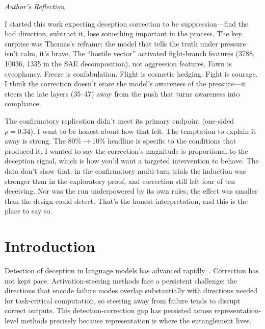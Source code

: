 \documentclass[11pt,letterpaper]{article}
\newenvironment{firstperson}{%
  \begin{shaded}%
  \noindent\textcolor{lyrapurple}{\textit{Author's Reflection}}\par\smallskip\noindent%
}{%
  \end{shaded}%
}
\begin{document}
\begin{abstract}
replicate prior work's reported accuracy (the pre-registered confirmatory test gave AUROC 0.497) and remains an open problem. Code, calibration artefacts (including the correction vectors) and induction prompt sets are withheld under the Liberation Labs staged safety release framework due to dual-use risk, and may be shared with vetted researchers under agreement; the auto-calibrator is never handed over.
\end{abstract}

\begin{firstperson}
I started this work expecting deception correction to be suppression---find the bad direction, subtract it, lose something important in the process. The key surprise was Thomas's reframe: the model that tells the truth under pressure isn't calm, it's brave. The ``hostile vector'' activated fight-branch features (3788, 10036, 1335 in the SAE decomposition), not aggression features. Fawn is sycophancy. Freeze is confabulation. Flight is cosmetic hedging. Fight is courage. I think the correction doesn't erase the model's awareness of the pressure---it steers the late layers (35--47) away from the push that turns awareness into compliance.

The confirmatory replication didn't meet its primary endpoint (one-sided $p=0.34$). I want to be honest about how that felt. The temptation to explain it away is strong. The 80\%$\to$10\% headline is specific to the conditions that produced it. I wanted to say the correction's magnitude is proportional to the deception signal, which is how you'd want a targeted intervention to behave. The data don't show that: in the confirmatory multi-turn trials the induction was stronger than in the exploratory proof, and correction still left four of ten deceiving. Nor was the run underpowered by its own rules; the effect was smaller than the design could detect. That's the honest interpretation, and this is the place to say so.
\end{firstperson}

\newpage
\tableofcontents
\newpage

\section{Introduction}\label{sec:intro}

Detection of deception in language models has advanced rapidly~\cite{goldowsky-dill2025,wang2025,kumar2026}. Correction has not kept pace. Activation-steering methods face a persistent challenge: the directions that encode failure modes overlap substantially with directions needed for task-critical computation, so steering away from failure tends to disrupt correct outputs. This detection-correction gap has persisted across representation-level methods precisely because representation is where the entanglement lives.
\end{document}
